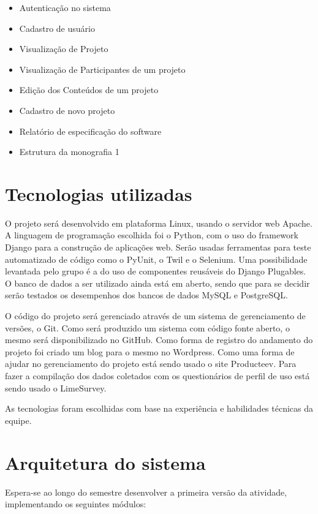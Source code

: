 \documentclass[a4paper,12pt,font=plain,header=plain]{abnt}
\begin{document}
	\begin{itemize}
	 \item Autenticação no sistema
	 \item Cadastro de usuário
	 \item Visualização de Projeto
	 \item Visualização de Participantes de um projeto
	 \item Edição dos Conteúdos de um projeto
	 \item Cadastro de novo projeto
	 \item Relatório de especificação do software
	 \item Estrutura da monografia 1
	\end{itemize}


  \section{Tecnologias utilizadas}
    O projeto será desenvolvido em plataforma Linux, usando o servidor web Apache. A linguagem de programação escolhida foi o Python, com o uso do framework Django para a construção de aplicações web. Serão usadas ferramentas para teste automatizado de código como o PyUnit, o Twil e o Selenium. Uma possibilidade levantada pelo grupo é a do uso de componentes reusáveis do Django Plugables. O banco de dados a ser utilizado ainda está em aberto, sendo que para se decidir serão testados os desempenhos dos bancos de dados MySQL e PostgreSQL.

    O código do projeto será gerenciado através de um sistema de gerenciamento de versões, o Git. Como será produzido um sistema com código fonte aberto, o mesmo será disponibilizado no GitHub. Como forma de registro do andamento do projeto foi criado um blog para o mesmo no Wordpress. Como uma forma de ajudar no gerenciamento do projeto está sendo usado o site Producteev. Para fazer a compilação dos dados coletados com os questionários de perfil de uso está sendo usado o LimeSurvey.

    As tecnologias foram escolhidas com base na experiência e habilidades técnicas da equipe.

  \section{Arquitetura do sistema}

    Espera-se ao longo do semestre desenvolver a primeira versão da atividade, implementando os seguintes módulos:
\end{document}
